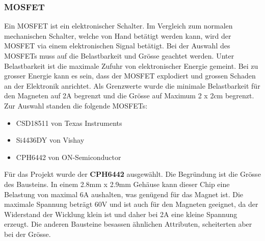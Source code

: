 \subsubsection{MOSFET}
Ein MOSFET ist ein elektronischer Schalter. Im Vergleich zum normalen mechanischen Schalter, welche von Hand betätigt werden kann, wird der MOSFET via einem elektronischen Signal betätigt.
\newpara
Bei der Auswahl des MOSFETs muss auf die Belastbarkeit und Grösse geachtet werden. Unter Belastbarkeit ist die maximale Zufuhr von elektronischer Energie gemeint. Bei zu grosser Energie kann es sein, dass der MOSFET explodiert und grossen Schaden an der Elektronik anrichtet. Als Grenzwerte wurde die minimale Belastbarkeit für den Magneten auf 2A begrenzt und die Grösse auf Maximum 2 x 2cm begrenzt. Zur Auswahl standen die folgende MOSFETs:
\newpage
\begin{itemize}
    \item CSD18511 von Texas Instruments
    \item Si4436DY von Vishay
    \item CPH6442 von ON-Semiconductor
\end{itemize}

Für das Projekt wurde der \textbf{CPH6442} ausgewählt. Die Begründung ist die Grösse des Bausteins. In einem 2.8mm x 2.9mm Gehäuse kann dieser Chip eine Belastung von maximal 6A aushalten, was genügend für das Magnet ist. Die maximale Spannung beträgt 60V und ist auch für den Magneten geeignet, da der Widerstand der Wicklung klein ist und daher bei 2A eine kleine Spannung erzeugt. Die anderen Bausteine besassen ähnlichen Attributen, scheiterten aber bei der Grösse.
